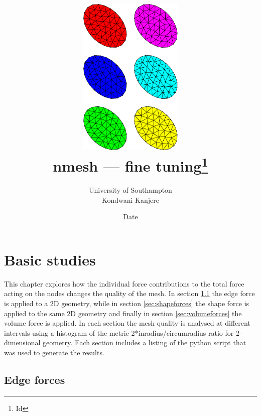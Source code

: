 \documentclass[10pt,a4paper]{book}
\begin{document}
 



\title{\includegraphics[width=5cm]{plots/somemesh}\\[2cm] 
\sffamily \huge nmesh --- fine tuning\thanks{ \sffamily \footnotesize $ $Id$ $}
}
\author{ \sffamily University of Southampton\\
\sffamily Kondwani Kanjere}

\date{\small \sffamily $ $Date$ $ }

\maketitle


\tableofcontents


\chapter{Basic studies}
\label{chap:basicstudies}
This chapter explores how the individual force contributions to the total force acting on the nodes changes the quality of the mesh. In section \ref{sec:edgeforces} the edge force is applied to a 2D geometry, while in section \ref{sec:shapeforces} the shape force is applied to the same 2D geometry and finally in  section \ref{sec:volumeforces} the volume force is applied. In each section the mesh quality is analysed at different intervals using a histogram of the metric 2*inradius/circumradius ratio for 2-dimensional geometry. Each section includes a listing of the python script that was used to generate the results.



\section{Edge forces}
\label{sec:edgeforces}
\end{document}

